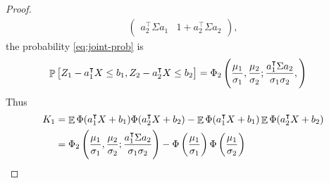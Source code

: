\documentclass[oneside, article]{memoir}
\DeclareMathOperator{\expect}{\mathbb{E}}
\DeclareMathOperator{\probability}{\mathbb{P}}
\begin{document}
\begin{proof}
\begin{align}
{\begin{pmatrix}
        a_2^\intercal \Sigma a_1
        &
        1 + a_2^\intercal \Sigma a_2
      \end{pmatrix}
    },
  \end{align}
  the probability \eqref{eq:joint-prob} is
  \begin{align}
    \probability\sbr{
      Z_1 - a_1^\intercal X \leq b_1, Z_2 - a_2^\intercal X \leq b_2
    }
    &= \Phi_2\del{
      \frac{\mu_1}{\sigma_1},
      \frac{\mu_2}{\sigma_2};
      \frac{a_1^\intercal \Sigma a_2}{
        \sigma_1\sigma_2
      },
    }
  \end{align}
  Thus
  \begin{align}
    K_1 &= \expect \Phi(a_1^\intercal X + b_1) \Phi(a_2^\intercal X + b_2) - \expect \Phi(a_1^\intercal X + b_1) \expect \Phi(a_2^\intercal X + b_2) \\
    &= \Phi_2\del{
      \frac{\mu_1}{\sigma_1},
      \frac{\mu_2}{\sigma_2};
      \frac{a_1^\intercal \Sigma a_2}{
        \sigma_1\sigma_2
      }
    } - \Phi\del{\frac{\mu_1}{\sigma_1}} \Phi\del{\frac{\mu_1}{\sigma_2}}
  \end{align}


\end{proof}
\end{document}

